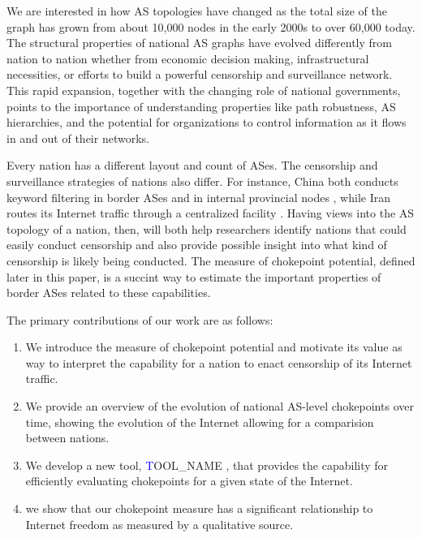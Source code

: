\documentclass[10pt, conference, letterpaper]{IEEEtran}
\newcommand{\toolname}{{\textcolor{blue}TOOL\_NAME }}
\begin{document}

We are interested in how AS topologies have changed as the total size of the graph has grown from about 10,000 nodes in the early 2000s to over 60,000 today.
The structural
properties of national AS graphs have evolved differently
from nation to nation whether from economic decision making, infrastructural necessities, or
efforts to build a powerful censorship and surveillance
network.
This rapid expansion, together with the changing role of national
governments, points to the importance of understanding properties like
path robustness, AS hierarchies, and the potential for organizations to
control information as it flows in and out of their networks.


\par Every nation has a different layout and count of ASes. The
censorship and surveillance strategies of nations also differ. For
instance, China both conducts keyword filtering in border ASes and in
internal provincial nodes \cite{chinafiltering}, while Iran routes its
Internet traffic through a centralized facility \cite{irancensor}.
Having views into the AS topology of a nation, then, will both help
researchers identify nations that could easily conduct censorship and
also provide possible insight into what kind of censorship is likely
being conducted. The measure of chokepoint potential, defined later in
this paper, is a succint way to estimate the important properties of
border ASes related to these capabilities.

\par
The primary contributions of our work are as follows: 
\begin{enumerate}
 \item We introduce the measure of chokepoint potential and 
motivate its value as way to interpret the capability for a nation to enact censorship of its Internet traffic.
 \item We provide an overview of the evolution of national AS-level chokepoints over time, showing the evolution of the Internet
allowing for a comparision between nations.
 \item We develop a new tool, \toolname, that provides the capability for
efficiently evaluating chokepoints for a given state of the Internet. 
 \item we show that our chokepoint measure
has a significant relationship to Internet freedom as measured by a qualitative source.
\end{enumerate}
\end{document}
